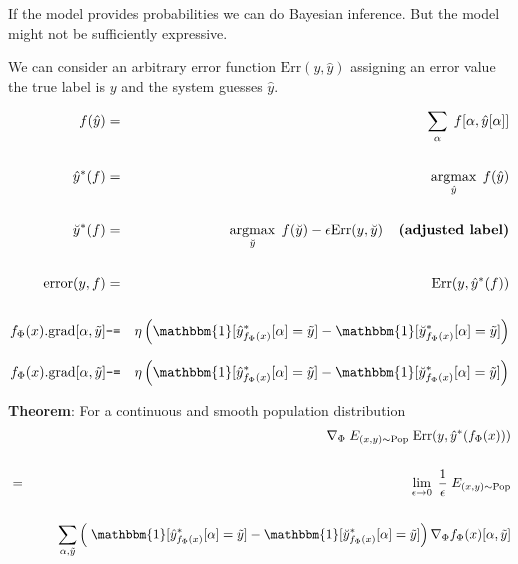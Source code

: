 {\vfill
If the model provides probabilities we can do Bayesian inference.  But the model might not be sufficiently expressive.

We can consider an arbitrary error function $\mathrm{Err}(y,\hat{y})$ assigning an error value the true label is $y$ and the system guesses $\hat{y}$.

\begin{eqnarray*}
  f(\hat{y}) & = & \sum_\alpha\; f[\alpha,\hat{y}[\alpha]] \\
  \\
  \hat{y}^*(f) & = & \argmax_{\hat{y}} \; f(\hat{y}) \\
  \\
  \breve{y}^*(f) & = & \argmax_{\breve{y}} \;f(\breve{y}) - \epsilon \mathrm{Err}(y,\breve{y}) \;\;\;\;\mbox{\bf (adjusted label)} \\
  \\
  \mathrm{error}(y,f) & = & \mathrm{Err}(y,\hat{y}^*(f)) \\
  \\
  f_\Phi(x).\mathrm{grad}[\alpha,\tilde{y}] & \minuseq & \eta\left(\mathbbm{1}[\hat{y}^*_{f_\Phi(x)}[\alpha] = \tilde{y}]
  - \mathbbm{1}[\breve{y}^*_{f_\Phi(x)}[\alpha] = \tilde{y}]\right) 
\end{eqnarray*}

\begin{eqnarray*}
    f_\Phi(x).\mathrm{grad}[\alpha,\tilde{y}] & \minuseq & \eta\left(\mathbbm{1}[\hat{y}^*_{f_\Phi(x)}[\alpha] = \tilde{y}]
  - \mathbbm{1}[\breve{y}^*_{f_\Phi(x)}[\alpha] = \tilde{y}]\right) 
\end{eqnarray*}

\vfill
{\bf Theorem}: For a continuous and smooth population distribution
\begin{eqnarray*}
  & & \nabla_\Phi  \;E_{(x,y) \sim \mathrm{Pop}}\;\mathrm{Err}(y,\hat{y}^*(f_\Phi(x))) \\
  \\
  & = & \lim_{\epsilon \rightarrow 0} \;\frac{1}{\epsilon}\; E_{(x,y) \sim \mathrm{Pop}} \\
  \\
  & & \;\;\;\;\;\;\sum_{\alpha,\tilde{y}} \left(\;\mathbbm{1}[\hat{y}^*_{f_\Phi(x)}[\alpha] = \tilde{y}]
  - \mathbbm{1}[\breve{y}^*_{f_\Phi(x)}[\alpha] = \tilde{y}] \right) \nabla_\Phi f_\Phi(x)[\alpha,\tilde{y}]
\end{eqnarray*}



}
